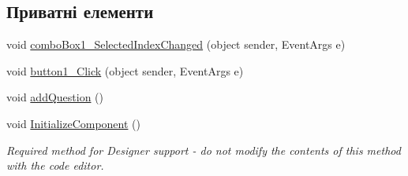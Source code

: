 \subsection*{Приватні елементи}
\begin{DoxyCompactItemize}
\item 
void \hyperlink{class_tests_1_1_form2_a6290a2a05345f3a6220f589a3f52f3fa}{combo\+Box1\+\_\+\+Selected\+Index\+Changed} (object sender, Event\+Args e)
\item 
void \hyperlink{class_tests_1_1_form2_af46cfa9c6945e9e5b25b0e0face3ba4d}{button1\+\_\+\+Click} (object sender, Event\+Args e)
\item 
void \hyperlink{class_tests_1_1_form2_a3d7513211542e9311844b6641eb9fd61}{add\+Question} ()
\item 
void \hyperlink{class_tests_1_1_form2_ac597a8f0343f236b4d1ea528528e138c}{Initialize\+Component} ()
\begin{DoxyCompactList}\small\item\em Required method for Designer support -\/ do not modify the contents of this method with the code editor. \end{DoxyCompactList}\end{DoxyCompactItemize}
